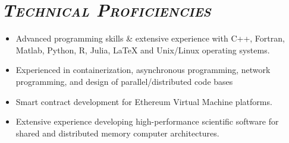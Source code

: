 \documentclass[10pt]{article}
\begin{document}
\section*{\sl {\bfseries{\textsc{\large Technical Proficiencies}}}}
\begin{itemize}
	\setlength{\itemsep}{0pt}
	\setlength{\parskip}{0pt}
	\item Advanced programming skills \& extensive experience with C++, Fortran, Matlab, Python, R, Julia, LaTeX and Unix/Linux operating systems. 
	\item Experienced in containerization, asynchronous programming, network programming, and design of parallel/distributed code bases
    \item Smart contract development for Ethereum Virtual Machine platforms. 
	\item Extensive experience developing high-performance scientific software for shared and distributed memory computer architectures. 
\end{itemize}
\end{document}
